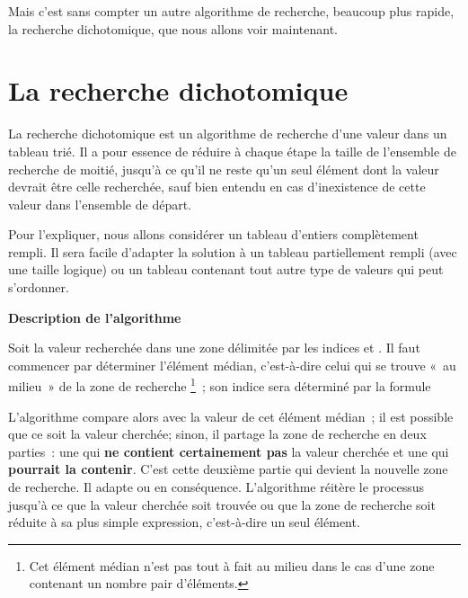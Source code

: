 			Mais c’est sans compter un autre algorithme de recherche, beaucoup
			plus rapide, la recherche dichotomique, que nous allons voir
			maintenant.
			
	\section{La recherche dichotomique} 

		La recherche dichotomique est un algorithme de recherche d’une valeur
		dans un tableau trié.  Il a pour essence de réduire à chaque étape la
		taille de l’ensemble de recherche de moitié, jusqu’à ce qu’il ne reste
		qu’un seul élément dont la valeur devrait être celle recherchée, sauf
		bien entendu en cas d’inexistence de cette valeur dans l’ensemble de
		départ. 
	
		Pour l’expliquer, nous allons considérer un tableau d’entiers
		complètement rempli.  Il sera facile d’adapter la solution à un tableau
		partiellement rempli (avec une taille logique) ou un tableau contenant
		tout autre type de valeurs qui peut s’ordonner.
		
		{\sffamily\bfseries\upshape
		Description de l’algorithme}
	
		Soit  la valeur recherchée dans une zone délimitée 
		par les indices  et . 
		Il faut commencer par déterminer l’élément médian, 
		c’est-à-dire celui qui se trouve «~au milieu~» 
		de la zone de recherche%
		\footnote{%
			Cet élément médian n’est pas tout à fait au milieu 
			dans le cas d’une zone contenant un nombre pair d’éléments.
		}~; 
		son indice sera déterminé par la formule
	
		{\centering
		\par{}
		}

		L'algorithme compare alors  avec la valeur de cet élément
		médian~; il est possible que ce soit la valeur cherchée; sinon, il
		partage la zone de recherche en deux parties~: une qui \textbf{ne
		contient certainement pas} la valeur cherchée et une qui
		\textbf{pourrait la contenir}.  C’est cette deuxième partie qui devient
		la nouvelle zone de recherche.  Il adapte  ou
		 en conséquence.  L'algorithme réitère le processus
		jusqu’à ce que la valeur cherchée soit trouvée ou que la zone de
		recherche soit réduite à sa plus simple expression, c’est-à-dire un seul
		élément.
			
